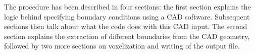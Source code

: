 The procedure has been described in four sections: the first section explains the logic behind specifying boundary conditions using a CAD software. Subsequent sections then talk about what the code does with this CAD input. The second section explains the extraction of different boundaries from the CAD geometry, followed by two more sections on voxelization and writing of the output file.









